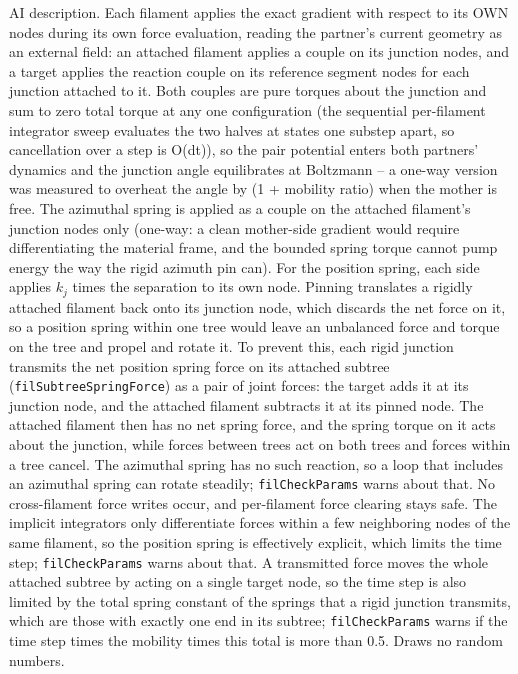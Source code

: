 \documentclass {scrbook}
\newcommand {\ttt} {\texttt}
\begin{document}
\begin{description}
AI description. Each filament applies the exact gradient with respect to its OWN nodes during its own force evaluation, reading the partner's current geometry as an external field: an attached filament applies a couple on its junction nodes, and a target applies the reaction couple on its reference segment nodes for each junction attached to it. Both couples are pure torques about the junction and sum to zero total torque at any one configuration (the sequential per-filament integrator sweep evaluates the two halves at states one substep apart, so cancellation over a step is O(dt)), so the pair potential enters both partners' dynamics and the junction angle equilibrates at Boltzmann -- a one-way version was measured to overheat the angle by (1 + mobility ratio) when the mother is free. The azimuthal spring is applied as a couple on the attached filament's junction nodes only (one-way: a clean mother-side gradient would require differentiating the material frame, and the bounded spring torque cannot pump energy the way the rigid azimuth pin can). For the position spring, each side applies $k_j$ times the separation to its own node. Pinning translates a rigidly attached filament back onto its junction node, which discards the net force on it, so a position spring within one tree would leave an unbalanced force and torque on the tree and propel and rotate it. To prevent this, each rigid junction transmits the net position spring force on its attached subtree (\ttt{filSubtreeSpringForce}) as a pair of joint forces: the target adds it at its junction node, and the attached filament subtracts it at its pinned node. The attached filament then has no net spring force, and the spring torque on it acts about the junction, while forces between trees act on both trees and forces within a tree cancel. The azimuthal spring has no such reaction, so a loop that includes an azimuthal spring can rotate steadily; \ttt{filCheckParams} warns about that. No cross-filament force writes occur, and per-filament force clearing stays safe. The implicit integrators only differentiate forces within a few neighboring nodes of the same filament, so the position spring is effectively explicit, which limits the time step; \ttt{filCheckParams} warns about that. A transmitted force moves the whole attached subtree by acting on a single target node, so the time step is also limited by the total spring constant of the springs that a rigid junction transmits, which are those with exactly one end in its subtree; \ttt{filCheckParams} warns if the time step times the mobility times this total is more than 0.5. Draws no random numbers.


\end{description}
\end{document}
